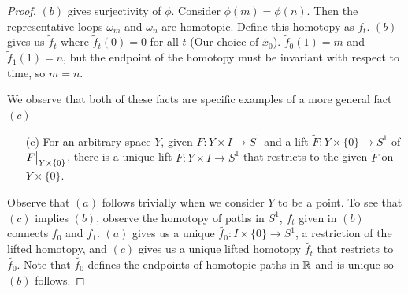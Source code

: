 \documentclass[10pt]{article}
\newcommand\restr[2]{{%
  \left.\kern-\nulldelimiterspace %
  #1 %
  \vphantom{\big|} %
  \right|_{#2} %
}}
\begin{document}
\begin{proof}
$(b)$ gives surjectivity of $\phi$. Consider $\phi(m) = \phi(n)$. Then the representative loops $\omega_m$ and $\omega_n$ are homotopic. Define this homotopy as $f_t$. $(b)$ gives us $\tilde{f}_t$ where $\tilde{f}_t(0) = 0$ for all $t$ (Our choice of $\tilde{x_0}$). $\tilde{f}_0(1) = m$ and $\tilde{f}_1(1) = n$, but the endpoint of the homotopy must be invariant with respect to time, so $m = n$.

We observe that both of these facts are specific examples of a more general fact $(c)$

\begin{itemize}
	\item[(c)] For an arbitrary space $Y$, given $F: Y \times I \to S^1$ and a lift $\tilde{F}: Y \times \{0\} \to S^1$ of $\restr{F}{Y \times \{0\}}$, there is a unique lift $\tilde{F}: Y \times I \to S^1$ that restricts to the given $\tilde{F}$ on $Y \times \{0\}$.
\end{itemize}

Observe that $(a)$ follows trivially when we consider $Y$ to be a point. 
To see that $(c)$ implies $(b)$, observe the homotopy of paths in $S^1$, $f_t$ given in $(b)$ connects $f_0$ and $f_1$. $(a)$ gives us a unique $\tilde{f_0}: I \times \{0\} \to S^1$, a restriction of the lifted homotopy, and $(c)$ gives us a unique lifted homotopy $\tilde{f_t}$ that restricts to $\tilde{f_0}$. Note that $\tilde{f_0}$ defines the endpoints of homotopic paths in $\mathbb{R}$ and is unique so $(b)$ follows.

% 
% 
% 

\end{proof}
\end{document}
